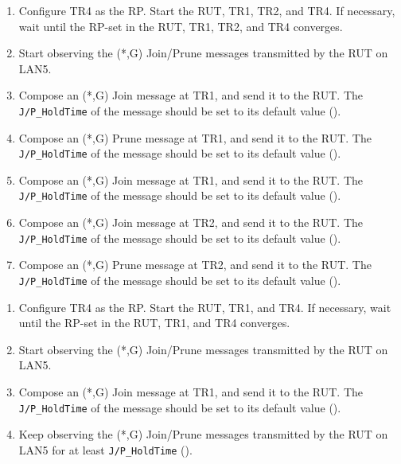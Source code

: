 \documentclass[11pt]{report}
\begin{document}


\begin{enumerate}

  \item Configure TR4 as the RP. Start the RUT, TR1, TR2, and TR4. If
  necessary, wait until the RP-set in the RUT, TR1, TR2, and TR4
  converges.

  \item Start observing the (*,G) Join/Prune messages transmitted by the
  RUT on LAN5.

  \item Compose an (*,G) Join message at TR1, and send it to the RUT. 
  The \verb=J/P_HoldTime= of the message should be set to its default
  value ({\PimsmJPHoldTime}).

  \item Compose an (*,G) Prune message at TR1, and send it to the RUT. 
  The \verb=J/P_HoldTime= of the message should be set to its default
  value ({\PimsmJPHoldTime}).

  \item Compose an (*,G) Join message at TR1, and send it to the RUT. 
  The \verb=J/P_HoldTime= of the message should be set to its default
  value ({\PimsmJPHoldTime}).

  \item Compose an (*,G) Join message at TR2, and send it to the RUT. 
  The \verb=J/P_HoldTime= of the message should be set to its default
  value ({\PimsmJPHoldTime}).

  \item Compose an (*,G) Prune message at TR2, and send it to the RUT. 
  The \verb=J/P_HoldTime= of the message should be set to its default
  value ({\PimsmJPHoldTime}).

\end{enumerate}


\begin{enumerate}

  \item Configure TR4 as the RP. Start the RUT, TR1, and TR4. If
  necessary, wait until the RP-set in the RUT, TR1, and TR4
  converges.

  \item Start observing the (*,G) Join/Prune messages transmitted by the
  RUT on LAN5.

  \item Compose an (*,G) Join message at TR1, and send it to the RUT. 
  The \verb=J/P_HoldTime= of the message should be set to its default
  value ({\PimsmJPHoldTime}).

  \item Keep observing the (*,G) Join/Prune messages transmitted by the
  RUT on LAN5 for at least \verb=J/P_HoldTime= ({\PimsmJPHoldTime}).

\end{enumerate}
\end{document}
